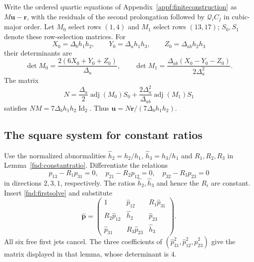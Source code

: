 \documentclass[11pt,a4paper]{article}
\numberwithin{equation}{section}
\theoremstyle{plain}
\theoremstyle{definition}
\theoremstyle{remark}
\begin{document}
Write the ordered quartic equations of Appendix~\ref{appf:finiteconstruction} as $M\boldsymbol u-\boldsymbol r$, with the residuals of the second prolongation followed by $\mathcal Q_iC_j$ in cubic-major order. Let $M_0$ select rows $(1,4)$ and $M_1$ select rows $(13,17)$; $S_0,S_1$ denote these row-selection matrices. For
\[
X_0=\Delta_bh_1h_2,\qquad Y_0=\Delta_ah_1h_3,\qquad Z_0=\Delta_{ab}h_2h_3
\]
their determinants are
\[
\det M_0=\frac{2(6X_0+Y_0+Z_0)}{\Delta_a},
\qquad \det M_1=\frac{\Delta_{ab}(X_0-Y_0-Z_0)}{2\Delta_a^2}.
\]
The matrix
\begin{equation}\label{fnd:uleftinverse}
N=\frac{\Delta_a}{2}\operatorname{adj}(M_0)S_0+
\frac{2\Delta_a^2}{\Delta_{ab}}\operatorname{adj}(M_1)S_1
\end{equation}
satisfies $NM=7\Delta_bh_1h_2\operatorname{Id}_2$. Thus $\boldsymbol u=N\boldsymbol r/(7\Delta_bh_1h_2)$.

\subsection{The square system for constant ratios}

Use the normalized abnormalities $\widehat h_2=h_2/h_1$,
$\widehat h_3=h_3/h_1$ and $R_1,R_2,R_3$
in Lemma~\ref{fnd:constantratio}. Differentiate the relations
\[
 p_{13}-R_1p_{31}=0,\quad p_{21}-R_2p_{12}=0,\quad
 p_{32}-R_3p_{23}=0
\]
in directions $2,3,1$, respectively. The ratios $\widehat h_2,\widehat h_3$
and hence the $R_i$ are constant. Insert \eqref{fnd:firstsolve} and substitute
\begin{equation}\label{appn:ratiosubstitution}
 \widehat{\boldsymbol p}=
 \begin{pmatrix}1&\widehat p_{12}&R_1\widehat p_{31}\\R_2\widehat p_{12}&\widehat h_2&\widehat p_{23}\\\widehat p_{31}&R_3\widehat p_{23}&\widehat h_3\end{pmatrix}.
\end{equation}
All six free first jets cancel. The three coefficients of
$(\widehat p_{31}^2,\widehat p_{12}^2,\widehat p_{23}^2)$ give the matrix displayed in that lemma,
whose determinant is $4$.
\end{document}
